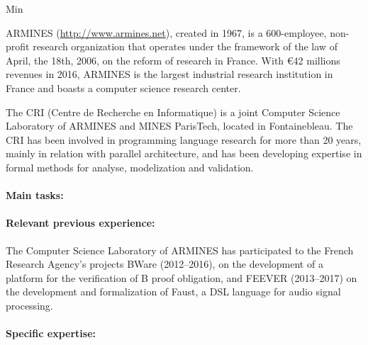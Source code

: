 \begin{sitedescription}{Min}

ARMINES (\url{http://www.armines.net}), created in 1967, is a
600-employee, non-profit research organization that operates under the
framework of the law of April, the 18th, 2006, on the reform of
research in France. With €42 millions revenues in 2016, ARMINES is the
largest industrial research institution in France and boasts a
computer science research center.

The CRI (Centre de Recherche en Informatique) is a joint Computer
Science Laboratory of ARMINES and MINES ParisTech, located in
Fontainebleau. The CRI has been involved in programming language
research for more than 20 years, mainly in relation with parallel
architecture, and has been developing expertise in formal methods for
analyse, modelization and validation.


\paragraph{Main tasks:}

\begin{compactitem}
\item{} 
\end{compactitem}


\paragraph{Relevant previous experience:}

The Computer Science Laboratory of ARMINES has participated to the
French Research Agency's projects BWare (2012–2016), on the
development of a platform for the verification of B proof obligation,
and FEEVER (2013–2017) on the development and formalization of Faust,
a DSL language for audio signal processing.


\paragraph{Specific expertise:}

\begin{compactitem}
\item {}
\end{compactitem}


\end{sitedescription}
